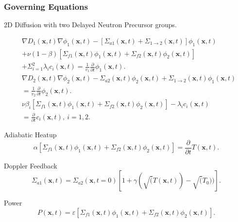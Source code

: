 \documentclass[fleqn]{beamer}
\renewcommand{\vec}[1]{\bm{#1}} %
\begin{document}
    \begin{frame}
    \frametitle{Governing Equations}
\begin{block}{2D Diffusion with two Delayed Neutron Precursor groups.}

	\begin{align*}
	\label{eq:Diffusion}
	& \nabla D_1(\vec{x},t)\nabla \phi_1(\vec{x},t)-[\Sigma_{a1}(\vec{x},t)+\Sigma_{1\rightarrow2}(\vec{x},t)]\phi_1(\vec{x},t)\\
	& +\nu( 1- \beta )[\Sigma_{f1}(\vec{x},t)\phi_1(\vec{x},t)+\Sigma_{f2}(\vec{x},t)\phi_2(\vec{x},t)]\\
	& +\Sigma_{i=1}^{2}\lambda_i c_i (\vec{x},t)=\frac{1}{v_1}\frac{\partial}{\partial t}\phi_1(\vec{x},t).\\
	& \nabla D_2(\vec{x},t)\nabla \phi_2(\vec{x},t)-\Sigma_{a2}(\vec{x},t)\phi_2(\vec{x},t)+\Sigma_{1\rightarrow2}(\vec{x},t)\phi_1(\vec{x},t)\\
	& =\frac{1}{v_2}\frac{\partial}{\partial t}\phi_2(\vec{x},t).\\
	& \nu\beta_i[\Sigma_{f1}(\vec{x},t)\phi_1(\vec{x},t)+\Sigma_{f2}(\vec{x},t)\phi_2(\vec{x},t)]-\lambda_ic_i(\vec{x},t)\\
	&=\frac{\partial}{\partial t}c_i(\vec{x},t), \ i=1,2.
	\end{align*}
\end{block}
\end{frame}
\begin{frame}
\begin{block}{Adiabatic Heatup}
\begin{equation*}
\alpha[\Sigma_{f1}(\vec{x},t)\phi_1(\vec{x},t)+\Sigma_{f2}(\vec{x},t)\phi_2(\vec{x},t)]=\frac{\partial}{\partial t}T(\vec{x},t).
\end{equation*}
\end{block}

\begin{block}{Doppler Feedback}
\begin{equation*}
\Sigma_{a1}(\vec{x},t) = \Sigma_{a2}(\vec{x},t=0)[1+\gamma(\sqrt(T(\vec{x},t))-\sqrt(T_0))].
\end{equation*}
\end{block}

\begin{block}{Power}
\begin{equation*}
P(\vec{x},t)=\varepsilon [\Sigma_{f1}(\vec{x},t)\phi_1(\vec{x},t)+\Sigma_{f2}(\vec{x},t)\phi_2(\vec{x},t)].
\end{equation*}
\end{block}
\end{frame}
%
\end{document}
